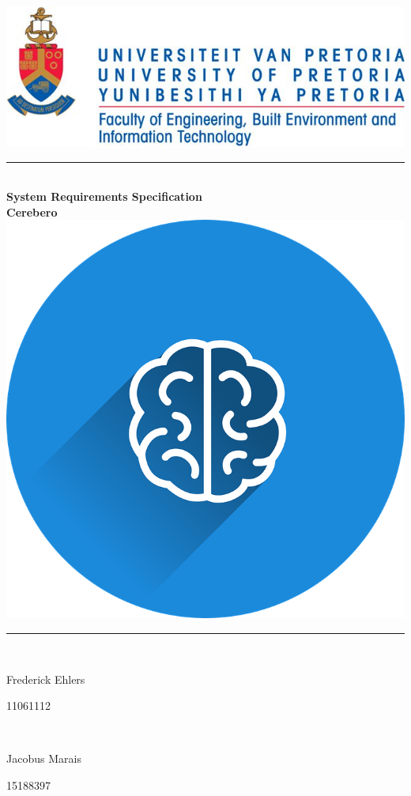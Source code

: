 \begin{titlepage}
	
	\begin{center}
		\includegraphics[width=0.7\linewidth]{Images/uniLogo.jpg}\\
		\rule{\linewidth}{0.5mm} \\[0.5cm]
		{ \huge \bfseries System Requirements Specification}\\[0.3cm]
		{ \huge \bfseries Cerebero}\\[0.3cm]
		\includegraphics[width=0.2\linewidth]{Images/cerebero.png}\\
		\rule{\linewidth}{0.6mm} \\[0.5cm] 		
  
		
		\begin{minipage}{0.4\textwidth}
			\begin{flushleft} \large
				Frederick Ehlers 
			\end{flushleft}
		\end{minipage}
		\begin{minipage}{0.4\textwidth}
			\begin{flushright} \large
				11061112
			\end{flushright}
		\end{minipage} \\[0.2cm]

		\begin{minipage}{0.4\textwidth}
			\begin{flushleft} \large
				 Jacobus Marais
			\end{flushleft}
		\end{minipage}
		\begin{minipage}{0.4\textwidth}
			\begin{flushright} \large
				15188397 
			\end{flushright}
		\end{minipage}\\[0.2cm]


\end{center}
\end{titlepage}
